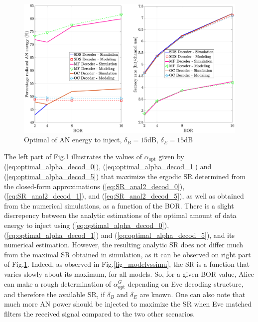 \documentclass[journal,comsoc]{IEEEtran}
\let\MYoriglatexcaption\caption
\renewcommand{\caption}[2][\relax]{\MYoriglatexcaption[#2]{#2}}
\begin{document}
\begin{figure}[h!t]
	\centering
	\includegraphics[width=1\linewidth]{graphs/optimal_alpha_15dB.eps}
	\caption{Optimal of AN energy to inject, $\delta_B = 15$dB,  $\delta_E = 15$dB}
	\label{fig_optimalAN}
\end{figure}
The left part of Fig.\ref{fig_optimalAN} illustrates the values of $\alpha_{\text{opt}}$ given by (\ref{eq:optimal_alpha_decod_0}), (\ref{eq:optimal_alpha_decod_1}) and (\ref{eq:optimal_alpha_decod_5}) that maximize the  ergodic SR determined from the closed-form approximations (\ref{eq:SR_anal2_decod_0}), (\ref{eq:SR_anal2_decod_1}), and (\ref{eq:SR_anal2_decod_5}), as well as obtained from the numerical simulations, as a function of the BOR. There is a slight discrepency between the analytic estimations of the optimal amount of data energy to inject using (\ref{eq:optimal_alpha_decod_0}), (\ref{eq:optimal_alpha_decod_1}) and (\ref{eq:optimal_alpha_decod_5}), and its numerical estimation. However, the resulting analytic SR does not differ much from the maximal SR obtained in simulation, as it can be observed on right part of Fig.\ref{fig_optimalAN}. Indeed, as observed in Fig.\ref{fig_modelvssimu}, the SR is a function that varies slowly about its maximum, for all models. So, for a given BOR value, Alice can make a rough determination of $\alpha_{\text{opt}}^G$ depending on Eve decoding structure, and therefore the available SR, if $\delta_B$ and $\delta_E$ are known. One can also note that much more AN power should be injected to maximize the SR when Eve matched filters the received signal compared to the two other scenarios.
\end{document}

